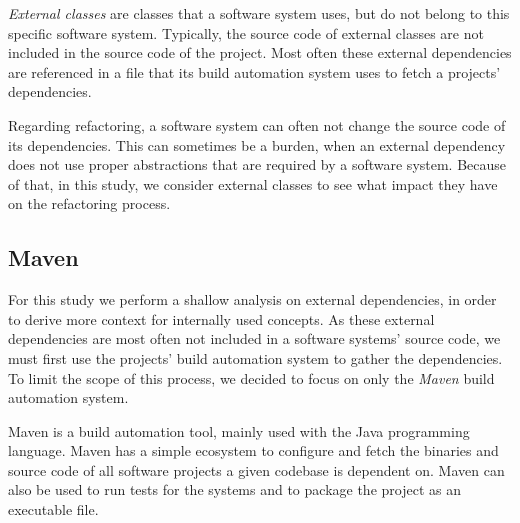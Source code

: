\textit{External classes} are classes that a software system uses, but do not belong to this specific software system. Typically, the source code of external classes are not included in the source code of the project. Most often these external dependencies are referenced in a file that its build automation system uses to fetch a projects' dependencies.

Regarding refactoring, a software system can often not change the source code of its dependencies. This can sometimes be a burden, when an external dependency does not use proper abstractions that are required by a software system. Because of that, in this study, we consider external classes to see what impact they have on the refactoring process.

\subsection{Maven}
For this study we perform a shallow analysis on external dependencies, in order to derive more context for internally used concepts. As these external dependencies are most often not included in a software systems' source code, we must first use the projects' build automation system to gather the dependencies. To limit the scope of this process, we decided to focus on only the \textit{Maven} build automation system.

Maven is a build automation tool, mainly used with the Java programming language. Maven has a simple ecosystem to configure and fetch the binaries and source code of all software projects a given codebase is dependent on. Maven can also be used to run tests for the systems and to package the project as an executable file.
